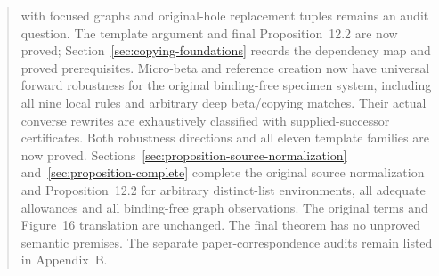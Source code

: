 \documentclass[11pt,a4paper]{article}
\theoremstyle{definition}
\theoremstyle{plain}
\theoremstyle{remark}
\begin{document}
\begin{abstract}
with focused graphs and original-hole replacement tuples remains an audit
question. The template argument and final Proposition~12.2 are now proved;
Section~\ref{sec:copying-foundations} records the dependency map and proved
prerequisites. Micro-beta and reference creation now have universal forward
robustness for the original binding-free specimen system, including all nine
local rules and arbitrary deep beta/copying matches. Their actual converse
rewrites are exhaustively classified with supplied-successor certificates.
Both robustness directions and all eleven template families are now proved.
Sections~\ref{sec:proposition-source-normalization} and~\ref{sec:proposition-complete}
complete the original source normalization and Proposition~12.2 for arbitrary
distinct-list environments, all adequate allowances and all binding-free graph
observations. The original terms and Figure~16 translation are unchanged.
The final theorem has no unproved semantic premises. The separate
paper-correspondence audits remain listed in Appendix~B.
\end{abstract}
\clearpage
\begingroup
\fontsize{9.5}{10.5}\selectfont
\setlength{\parskip}{0pt}
\tableofcontents
\endgroup
\clearpage



















































\end{document}
